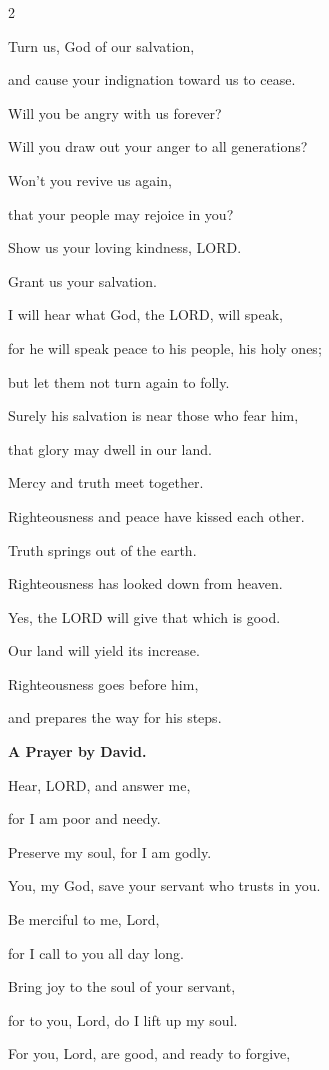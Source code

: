 \begin{multicols}{2}
	
	\myverse{}Turn us, God of our salvation,
	
	and cause your indignation toward us to cease.
	
	
	\myverse{}Will you be angry with us forever?
	
	Will you draw out your anger to all generations?
	
	
	\myverse{}Won’t you revive us again,
	
	that your people may rejoice in you?
	
	
	\myverse{}Show us your loving kindness, LORD.
	
	Grant us your salvation.
	
	
	\myverse{}I will hear what God, the LORD, will speak,
	
	for he will speak peace to his people, his holy ones;
	
	but let them not turn again to folly.
	
	
	\myverse{}Surely his salvation is near those who fear him,
	
	that glory may dwell in our land.
	
	
	\myverse{}Mercy and truth meet together.
	
	Righteousness and peace have kissed each other.
	
	
	\myverse{}Truth springs out of the earth.
	
	Righteousness has looked down from heaven.
	
	
	\myverse{}Yes, the LORD will give that which is good.
	
	Our land will yield its increase.
	
	
	\myverse{}Righteousness goes before him,
	
	and prepares the way for his steps.
	
	
	\mychapter{}\textbf{A Prayer by David.}
	
	\quad \myverse*{}Hear, LORD, and answer me,
	
	for I am poor and needy.
	
	
	\myverse{}Preserve my soul, for I am godly.
	
	You, my God, save your servant who trusts in you.
	
	
	\myverse{}Be merciful to me, Lord,
	
	for I call to you all day long.
	
	
	\myverse{}Bring joy to the soul of your servant,
	
	for to you, Lord, do I lift up my soul.
	
	
	\myverse{}For you, Lord, are good, and ready to forgive,
	

\end{multicols}
